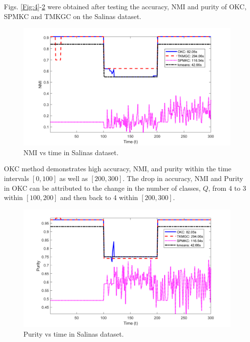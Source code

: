 \documentclass[10pt,final]{IEEEtran}
\begin{document}
Figs. \ref{Fig:4}-\ref{Fig:6} were obtained after testing the accuracy, NMI and purity of OKC, SPMKC and TMKGC on the Salinas dataset. %
\begin{figure}[htp]
    \centering
    \includegraphics[scale=0.19]{avg_combined_NMI_plots_Salinas.png}
    \caption{NMI vs time in Salinas dataset.}
    \label{Fig:5}
\end{figure}
OKC method demonstrates high accuracy, NMI, and purity within the time intervals $[0,100]$ as well as $[200,300]$. The drop in accuracy, NMI and Purity in OKC can be attributed to the change in the number of classes, \begin{math}Q\end{math}, from 4 to 3 within $[100,200]$ and then back to 4  within $[200,300]$.
\begin{figure}[htp]
    \centering
    \includegraphics[scale=0.19]{avg_combined_Purity_plots_Salinas.png}
    \caption{Purity vs time in Salinas dataset.}
    \label{Fig:6}
\end{figure}
\end{document}
